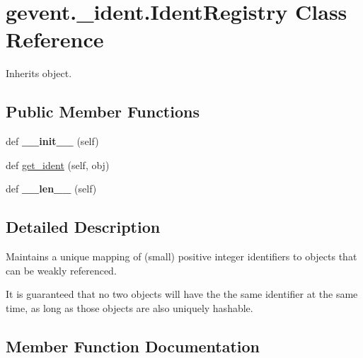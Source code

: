 \hypertarget{classgevent_1_1__ident_1_1_ident_registry}{}\section{gevent.\+\_\+ident.\+Ident\+Registry Class Reference}
\label{classgevent_1_1__ident_1_1_ident_registry}


Inherits object.

\subsection*{Public Member Functions}
\begin{DoxyCompactItemize}
\item 
\mbox{\label{classgevent_1_1__ident_1_1_ident_registry_a6148cf14110374b96c8166d9593deb42}} 
def {\bfseries \+\_\+\+\_\+init\+\_\+\+\_\+} (self)
\item 
def \hyperlink{classgevent_1_1__ident_1_1_ident_registry_a215c489c100608310db04df45b3d4da6}{get\+\_\+ident} (self, obj)
\item 
\mbox{\label{classgevent_1_1__ident_1_1_ident_registry_a21df6ce7561db73e7f5f5abb77d53704}} 
def {\bfseries \+\_\+\+\_\+len\+\_\+\+\_\+} (self)
\end{DoxyCompactItemize}


\subsection{Detailed Description}
\begin{DoxyVerb}Maintains a unique mapping of (small) positive integer identifiers
to objects that can be weakly referenced.

It is guaranteed that no two objects will have the the same
identifier at the same time, as long as those objects are
also uniquely hashable.
\end{DoxyVerb}
 

\subsection{Member Function Documentation}
\mbox{\label{classgevent_1_1__ident_1_1_ident_registry_a215c489c100608310db04df45b3d4da6}} 
